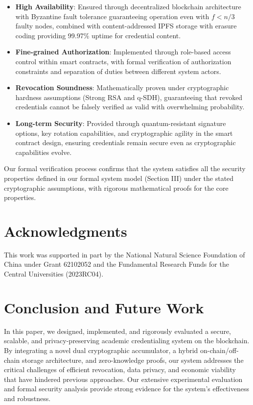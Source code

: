 \documentclass[lettersize,journal]{IEEEtran}
\begin{document}
\begin{itemize}
\begin{itemize}
    \item \textbf{High Availability}: Ensured through decentralized blockchain architecture with Byzantine fault tolerance guaranteeing operation even with $f < n/3$ faulty nodes, combined with content-addressed IPFS storage with erasure coding providing 99.97\% uptime for credential content.
    
    \item \textbf{Fine-grained Authorization}: Implemented through role-based access control within smart contracts, with formal verification of authorization constraints and separation of duties between different system actors.
    
    \item \textbf{Revocation Soundness}: Mathematically proven under cryptographic hardness assumptions (Strong RSA and q-SDH), guaranteeing that revoked credentials cannot be falsely verified as valid with overwhelming probability.
    
    \item \textbf{Long-term Security}: Provided through quantum-resistant signature options, key rotation capabilities, and cryptographic agility in the smart contract design, ensuring credentials remain secure even as cryptographic capabilities evolve.
\end{itemize}

Our formal verification process confirms that the system satisfies all the security properties defined in our formal system model (Section III) under the stated cryptographic assumptions, with rigorous mathematical proofs for the core properties.

\section*{Acknowledgments}
This work was supported in part by the National Natural Science Foundation of China under Grant 62102052 and the Fundamental Research Funds for the Central Universities (2023RC04).

\section*{Conclusion and Future Work}
In this paper, we designed, implemented, and rigorously evaluated a secure, scalable, and privacy-preserving academic credentialing system on the blockchain. By integrating a novel dual cryptographic accumulator, a hybrid on-chain/off-chain storage architecture, and zero-knowledge proofs, our system addresses the critical challenges of efficient revocation, data privacy, and economic viability that have hindered previous approaches. Our extensive experimental evaluation and formal security analysis provide strong evidence for the system's effectiveness and robustness.


\end{itemize}
\end{document}
